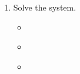 \documentclass[11pt]{article}
\begin{document}
\begin{itemize}
\begin{description}
\begin{enumerate}
			\item Solve the system. \\
			\begin{itemize}
				\item \hspace{10mm} \\
				\item \hspace{10mm} \\
				\item \hspace{10mm} \\
			\end{itemize}
		
		\end{enumerate}
		
		

		\end{description}

		




\newpage 


\end{itemize}


	
\end{document}
